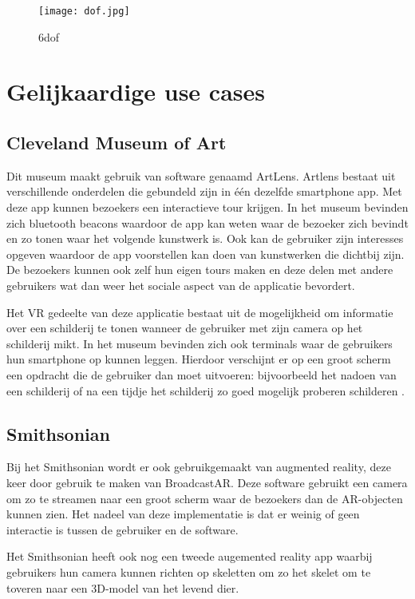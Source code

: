 \begin{figure}
    \texttt{[image: dof.jpg]}
    \caption{\acrfull{6dof}}
    \label{fig:dof}
\end{figure}


\section{Gelijkaardige use cases}
\subsection{Cleveland Museum of Art}\label{ch:cleveland}
Dit museum maakt gebruik van software genaamd ArtLens. Artlens bestaat uit verschillende onderdelen die gebundeld zijn in één dezelfde smartphone app. Met deze app kunnen bezoekers een interactieve tour krijgen. In het museum bevinden zich bluetooth beacons waardoor de app kan weten waar de bezoeker zich bevindt en zo tonen waar het volgende kunstwerk is. Ook kan de gebruiker zijn interesses opgeven waardoor de app voorstellen kan doen van kunstwerken die dichtbij zijn. 
De bezoekers kunnen ook zelf hun eigen tours maken en deze delen met andere gebruikers wat dan weer het sociale aspect van de applicatie bevordert.

Het VR gedeelte van deze applicatie bestaat uit de mogelijkheid om informatie over een schilderij te tonen wanneer de gebruiker met zijn camera op het schilderij mikt.
In het museum bevinden zich ook terminals waar de gebruikers hun smartphone op kunnen leggen. Hierdoor verschijnt er op een groot scherm een opdracht die de gebruiker dan moet uitvoeren: bijvoorbeeld het nadoen van een schilderij of na een tijdje het schilderij zo goed mogelijk proberen schilderen \autocite{Ding2017}.

\subsection{Smithsonian}
Bij het Smithsonian wordt er ook gebruikgemaakt van augmented reality, deze keer door gebruik te maken van BroadcastAR. Deze software gebruikt een camera om zo te streamen naar een groot scherm waar de bezoekers dan de AR-objecten kunnen zien. Het nadeel van deze implementatie is dat er weinig of geen interactie is tussen de gebruiker en de software. 

Het Smithsonian heeft ook nog een tweede augemented reality app waarbij gebruikers hun camera kunnen richten op skeletten om zo het skelet om te toveren naar een 3D-model van het levend dier.

